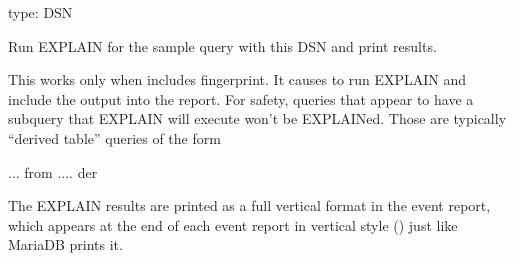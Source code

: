 \documentclass[letterpaper,10pt,english]{sphinxmanual}
\begin{document}
\begin{fulllineitems}
\label{\detokenize{mariadb-query-digest:cmdoption-mariadb-query-digest-explain}}
\sphinxAtStartPar
type: DSN

\sphinxAtStartPar
Run EXPLAIN for the sample query with this DSN and print results.

\sphinxAtStartPar
This works only when {\hyperref[\detokenize{mariadb-query-digest:cmdoption-mariadb-query-digest-group-by}]{}} includes fingerprint.  It causes
 to run EXPLAIN and include the output into the report.  For
safety, queries that appear to have a subquery that EXPLAIN will execute won’t
be EXPLAINed.  Those are typically “derived table” queries of the form

\begin{sphinxVerbatim}[commandchars=\\\{\}]
 ... from   ....  der
\end{sphinxVerbatim}

\sphinxAtStartPar
The EXPLAIN results are printed as a full vertical format in the event report,
which appears at the end of each event report in vertical style
() just like MariaDB prints it.

\end{fulllineitems}

\end{document}
